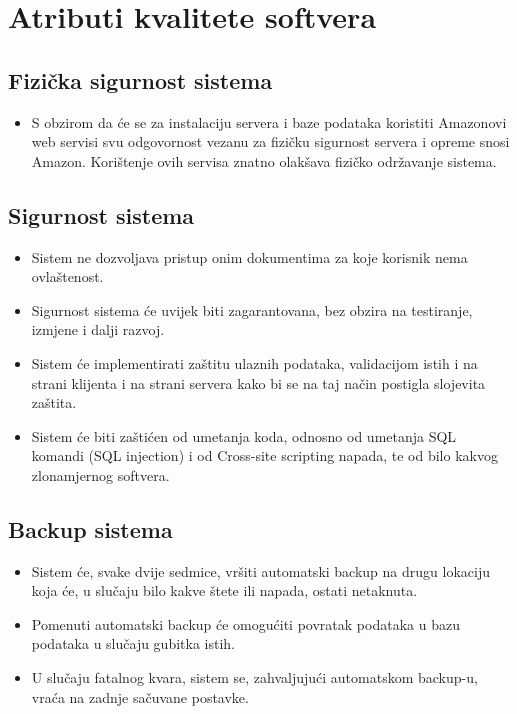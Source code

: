 \section{Atributi kvalitete softvera}

\subsection{Fizička sigurnost sistema}
\begin{itemize}
    \item S obzirom da će se za instalaciju servera i baze podataka koristiti Amazonovi web servisi svu odgovornost vezanu za fizičku sigurnost servera i opreme snosi Amazon. Korištenje ovih servisa znatno olakšava fizičko održavanje sistema.
\end{itemize}

\subsection{Sigurnost sistema}
\begin{itemize}
    \item Sistem ne dozvoljava pristup onim dokumentima za koje korisnik nema ovlaštenost.
    \item Sigurnost sistema će uvijek biti zagarantovana, bez obzira na testiranje, izmjene i dalji razvoj.
    \item Sistem će implementirati zaštitu ulaznih podataka, validacijom istih i na strani klijenta i na strani servera kako bi se na taj način postigla slojevita zaštita.
    \item Sistem će biti zaštićen od umetanja koda, odnosno od umetanja SQL komandi (SQL injection) i od Cross-site scripting napada, te od bilo kakvog zlonamjernog softvera.
\end{itemize}

\subsection{Backup sistema}
\begin{itemize}
    \item Sistem će, svake dvije sedmice, vršiti automatski backup na drugu lokaciju koja će, u slučaju bilo kakve štete ili napada, ostati netaknuta.
    \item Pomenuti automatski backup će omogućiti povratak podataka u bazu podataka u slučaju gubitka istih.
    \item U slučaju fatalnog kvara, sistem se, zahvaljujući automatskom backup-u, vraća na zadnje sačuvane postavke.
\end{itemize}

